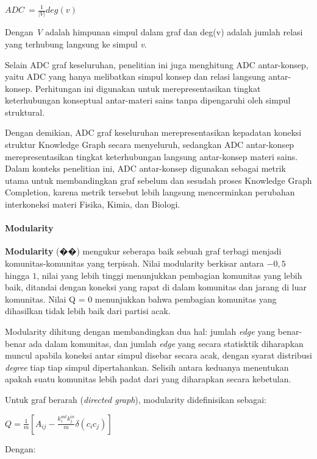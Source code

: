 \documentclass[
]{article}
\begin{document}
\(ADC\  = \frac{1}{|V|}deg(v)\)

Dengan \emph{V} adalah himpunan simpul dalam graf dan deg(v) adalah
jumlah relasi yang terhubung langsung ke simpul \emph{v}.

Selain ADC graf keseluruhan, penelitian ini juga menghitung ADC
antar-konsep, yaitu ADC yang hanya melibatkan simpul konsep dan relasi
langsung antar-konsep. Perhitungan ini digunakan untuk merepresentasikan
tingkat keterhubungan konseptual antar-materi sains tanpa dipengaruhi
oleh simpul struktural.

Dengan demikian, ADC graf keseluruhan merepresentasikan kepadatan
koneksi struktur Knowledge Graph secara menyeluruh, sedangkan ADC
antar-konsep merepresentasikan tingkat keterhubungan langsung
antar-konsep materi sains. Dalam konteks penelitian ini, ADC
antar-konsep digunakan sebagai metrik utama untuk membandingkan graf
sebelum dan sesudah proses Knowledge Graph Completion, karena metrik
tersebut lebih langsung mencerminkan perubahan interkoneksi materi
Fisika, Kimia, dan Biologi.

\hypertarget{modularity}{%
\paragraph{Modularity}\label{modularity}}

\textbf{Modularity} (��) mengukur seberapa baik sebuah graf terbagi
menjadi komunitas-komunitas yang terpisah. Nilai modularity berkisar
antara \(- 0,5\) hingga \(1\), nilai yang lebih tinggi menunjukkan
pembagian komunitas yang lebih baik, ditandai dengan koneksi yang rapat
di dalam komunitas dan jarang di luar komunitas. Nilai Q = 0 menunjukkan
bahwa pembagian komunitas yang dihasilkan tidak lebih baik dari partisi
acak.

Modularity dihitung dengan membandingkan dua hal: jumlah \emph{edge}
yang benar-benar ada dalam komunitas, dan jumlah \emph{edge} yang secara
statisktik diharapkan muncul apabila koneksi antar simpul disebar secara
acak, dengan syarat distribusi \emph{degree} tiap tiap simpul
dipertahankan. Selisih antara keduanya menentukan apakah suatu komunitas
lebih padat dari yang diharapkan secara kebetulan.

Untuk graf berarah (\emph{directed graph}), modularity didefinisikan
sebagai:

\(Q = \frac{1}{m}\left\lbrack A_{ij} - \frac{k_{i}^{out}k_{j}^{in}}{m}\delta\left( c_{i}c_{j} \right) \right\rbrack\)

Dengan:
\end{document}
